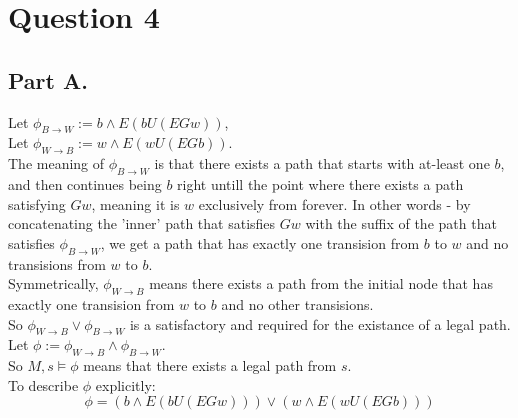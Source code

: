 \documentclass{article}
\begin{document}
\section*{Question 4}
\subsection*{Part A.}
Let $\phi_{B\rightarrow W}:=b\wedge E(bU(EGw))$,\\
Let $\phi_{W\rightarrow B}:=w\wedge E(wU(EGb))$.\\
The meaning of $\phi_{B\rightarrow W}$ is that there exists 
a path that starts with at-least one $b$, and then continues
being $b$ right untill the point where there exists a path satisfying $Gw$, meaning it
is $w$ exclusively from forever. In other words - 
by concatenating the 'inner' path that satisfies $Gw$ with the suffix of
the path that satisfies $\phi_{B\rightarrow W}$, we get a path
that has exactly one transision from $b$ to $w$ and no
transisions from $w$ to $b$.\\
Symmetrically, $\phi_{W\rightarrow B}$ means there exists a path
from the initial node that has
exactly one transision from $w$ to $b$ and no other transisions.\\
So $\phi_{W\rightarrow B}\vee \phi_{B\rightarrow W}$ is a 
satisfactory and required for the existance of a legal path.\\
Let $\phi:=\phi_{W\rightarrow B}\wedge \phi_{B\rightarrow W}$.\\
So $M,s\models \phi$ means that there exists a legal path from $s$.\\
To describe $\phi$ explicitly: 
\[
    \phi=
    (b\wedge E(bU(EGw)))\vee
    (w\wedge E(wU(EGb)))
\]
\end{document}
